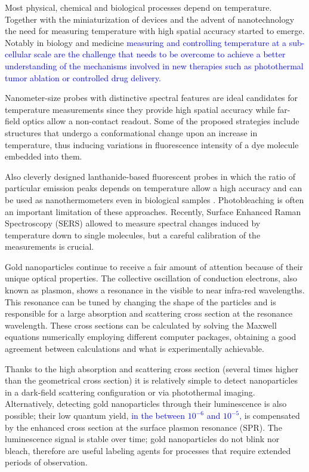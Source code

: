 \documentclass[journal=nalefd,manuscript=letter]{achemso}
\newcommand{\HI}[1]{\textcolor{blue}{#1}} %
\begin{document}
Most physical, chemical and biological processes depend on
temperature. Together with the miniaturization of devices and the advent of
nanotechnology the need for measuring temperature with high spatial accuracy
started to emerge. Notably in biology\cite{Yang2011a,Hrelescu2010} and
medicine\cite{Li2013c} \HI{measuring and controlling temperature at a sub-cellular scale are the challenge that needs to be overcome to achieve a better understanding of the mechanisms involved in new therapies such as photothermal tumor ablation\cite{Gobin2007} or controlled drug delivery\cite{Huang2006,Huo2014}.}

Nanometer-size probes with distinctive spectral features are ideal candidates
for temperature measurements since they provide high spatial accuracy while
far-field optics allow a non-contact readout. Some of the proposed strategies
include structures that undergo a conformational change upon an increase in
temperature\cite{Ebrahimi2014}, thus inducing variations in fluorescence
intensity of a dye molecule embedded into them.

Also cleverly designed lanthanide-based fluorescent probes in which the ratio of
particular emission peaks depends on temperature allow a high accuracy and can
be used as nanothermometers \cite{liu2016ratiometric} even in biological samples
\cite{Vetrone2010}. Photobleaching is often an important limitation of these
approaches. Recently, Surface Enhanced Raman Spectroscopy (SERS) allowed to
measure spectral changes induced by temperature down to single
molecules\cite{Pozzi2015}, but a careful calibration of the measurements is
crucial.

Gold nanoparticles continue to receive a fair amount of attention because of
their unique optical properties\cite{Zijlstra2011}. The collective oscillation
of conduction electrons, also known as plasmon, shows a resonance in the visible to
near infra-red wavelengths. This resonance can be tuned by changing the shape of
the particles\cite{Carattino2016} and is responsible for a large absorption
and scattering cross section at the resonance wavelength. These cross sections can
be calculated by solving the Maxwell equations numerically employing different computer
packages\cite{Draine1994,Yurkin2011,Oskooi2010}, obtaining a good agreement
between calculations and what is experimentally achievable. 

Thanks to the high absorption and scattering cross section (several times higher
than the geometrical cross section) it is relatively simple to detect
nanoparticles in a dark-field scattering configuration\cite{Hu2008} or via
photothermal imaging\cite{boyer2002photothermal, Berciaud2006}.
Alternatively, detecting gold nanoparticles through their
luminescence\cite{Tcherniak2011} is also possible; their low quantum
yield\cite{Fang2012,Rao2015,Yorulmaz2012,Cheng2015}, \HI{in the between $10^{-6}$ and $10^{-5}$,}	
is compensated by the enhanced cross section at the surface plasmon resonance
(SPR). The luminescence signal is stable over time; gold nanoparticles do not
blink nor bleach, therefore are useful labeling agents for processes that
require extended periods of observation\cite{Wang2005}.
\end{document}
